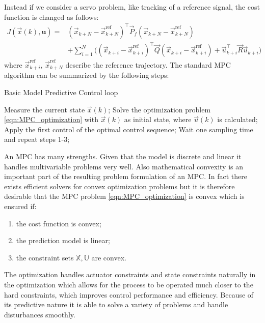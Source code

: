 Instead if we consider a servo problem, like tracking of a reference signal, the cost function is changed as follows:
\begin{equation}
\label{eqn:MPC_cost_function_servo}
\begin{aligned}
J(\vec{x}(k), \textbf{u})=& (\vec{x}_{k+N}-\vec{x}^\text{ref}_{k+N})^\intercal\vec{P}_f(\vec{x}_{k+N}-\vec{x}^\text{ref}_{k+N})\\
&+\sum_{i=1}^{N}\Big((\vec{x}_{k+i}-\vec{x}^\text{ref}_{k+i})^\intercal\vec{Q}(\vec{x}_{k+i}-\vec{x}^\text{ref}_{k+i})+\vec{u}_{k+i}^\intercal\vec{R}\vec{u}_{k+i}\Big)
\end{aligned}
\end{equation}
where $\vec{x}^\text{ref}_{k+i}$, $\vec{x}^\text{ref}_{k+N}$ describe the reference trajectory. The standard MPC algorithm can be summarized by the following steps:
\begin{algorithm}%
	\caption{Basic Model Predictive Control loop}
	\small
	\begin{algorithmic}[1]
		\State Measure the current state $\vec{x}(k)$;
		\State Solve the optimization problem \ref{eqn:MPC_optimization} with $\vec{x}(k)$ as initial state, where $\vec{u}(k)$ is calculated;
		\State Apply the first control of the optimal control sequence;
		\State Wait one sampling time and repeat steps 1-3;
	\end{algorithmic}
	\label{alg:MPCloop}
\end{algorithm}

An MPC has many strengths. Given that the model is discrete and linear it handles multivariable problems very well. Also mathematical convexity is an important part of the resulting problem formulation of an MPC. In fact there exists efficient solvers for convex optimization problems but it is therefore desirable that the MPC problem \ref{eqn:MPC_optimization} is convex which is ensured if:
\begin{enumerate}
\item the cost function is convex;
\item the prediction model is linear;
\item the constraint sets $\mathbb{X}, \mathbb{U}$ are convex.	
\end{enumerate}	
The optimization handles actuator constraints and state constraints naturally in the optimization which allows for
the process to be operated much closer to the hard constraints, which improves control performance and efficiency. Because of its predictive nature it is able to solve a variety of problems and handle disturbances smoothly.

